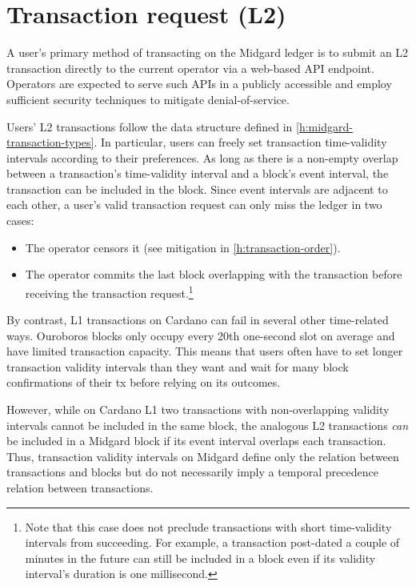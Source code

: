 \documentclass[../midgard.tex]{subfiles}
\begin{document}
\section{Transaction request (L2)}
\label{h:transaction-request}

A user's primary method of transacting on the Midgard ledger is to submit an L2 transaction directly to the current operator via a web-based API endpoint.
Operators are expected to serve such APIs in a publicly accessible and employ sufficient security techniques to mitigate denial-of-service.

Users' L2 transactions follow the data structure defined in \cref{h:midgard-transaction-types}.
In particular, users can freely set transaction time-validity intervals according to their preferences.
As long as there is a non-empty overlap between a transaction's time-validity interval and a block's event interval, the transaction can be included in the block.
Since event intervals are adjacent to each other, a user's valid transaction request can only miss the ledger in two cases:
\begin{itemize}
    \item The operator censors it (see mitigation in \cref{h:transaction-order}).
    \item The operator commits the last block overlapping with the transaction before receiving the transaction request.\footnote{Note that this case does not preclude transactions with short time-validity intervals from succeeding.
      For example, a transaction post-dated a couple of minutes in the future can still be included in a block even if its validity interval's duration is one millisecond.}
\end{itemize}

By contrast, L1 transactions on Cardano can fail in several other time-related ways.
Ouroboros blocks only occupy every 20th one-second slot on average and have limited transaction capacity.
This means that users often have to set longer transaction validity intervals than they want and wait for many block confirmations of their tx before relying on its outcomes.

However, while on Cardano L1 two transactions with non-overlapping validity intervals cannot be included in the same block, the analogous L2 transactions \emph{can} be included in a Midgard block if its event interval overlaps each transaction.
Thus, transaction validity intervals on Midgard define only the relation between transactions and blocks but do not necessarily imply a temporal precedence relation between transactions.

\todo
\end{document}

